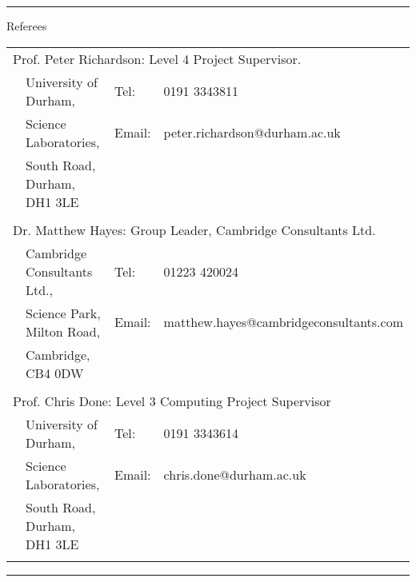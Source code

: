 \hrule\vspace{0.2cm}
\sc Referees \rm

\sc\footnotesize

\begin{tablehere}
  \begin{tabular}{p{\wa\textwidth} p{} p{} p{}}
    \multicolumn{4}{p{\wb\textwidth}}{\normalsize Prof$.$ Peter Richardson: \; Level 4 Project Supervisor.}				\\
    & 	University of Durham,			&	Tel:		&		0191 3343811							\\
    &	Science Laboratories,			&	Email:	&\rm		peter.richardson@durham.ac.uk			\\
    &	South Road, Durham, DH1 3LE	&			&											\\\\
    \multicolumn{4}{p{\wb\textwidth}}{\normalsize Dr$.$ Matthew Hayes: \; Group Leader, Cambridge Consultants Ltd.}	\\
    & 	Cambridge Consultants Ltd.,		&	Tel:		&		01223 420024							\\
    &	Science Park, Milton Road,		&	Email:	&\rm		matthew.hayes@cambridgeconsultants.com	\\
    &	Cambridge, CB4 0DW			&			&											\\\\
    \multicolumn{4}{p{\wb\textwidth}}{\normalsize Prof$.$ Chris Done: \; Level 3 Computing Project Supervisor}			\\
    & 	University of Durham,			&	Tel:		&		0191 3343614							\\
    &	Science Laboratories,			&	Email:	&\rm		chris.done@durham.ac.uk				\\
    &	South Road, Durham, DH1 3LE	&			&											\\\\
  \end{tabular}
\end{tablehere}
\hrule


